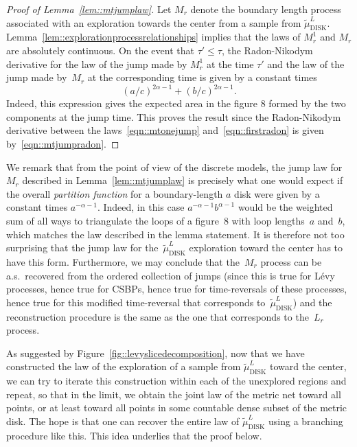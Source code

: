 \documentclass[JEP,XML,SOM,Unicode]{cedram}
\theoremstyle{plain}
\numberwithin{theorem}{section}
\theoremstyle{definition}
\newcommand{\tmudl}{\wt{\mu}_{\mathrm{DISK}}^L}
\let\wt\widetilde
\begin{document}
\begin{proof}[Proof of Lemma~\ref{lem::mtjumplaw}]
Let $M_r$ denote the boundary length process associated with an exploration towards the center from a sample from $\tmudl$. Lemma~\ref{lem::explorationprocessrelationships} implies that the laws of $M_r^1$ and $M_r$ are absolutely continuous. On the event that $\tau' \leq \tau$, the Radon-Nikodym derivative for the law of the jump made by $M_r^1$ at the time $\tau'$ and the law of the jump made by~$M_r$ at the corresponding time is given by a constant times
\begin{equation}
\label{eqn::mtjumpradon}
(a/c)^{2\alpha-1} + (b/c)^{2\alpha - 1}.
\end{equation}
Indeed, this expression gives the expected area in the figure $8$ formed by the two components at the jump time. This proves the result since the Radon-Nikodym derivative between the laws~\eqref{eqn::mtonejump} and~\eqref{eqn::firstradon} is given by~\eqref{eqn::mtjumpradon}.
\end{proof}

We remark that from the point of view of the discrete models, the jump law for~$M_r$ described in Lemma~\ref{lem::mtjumplaw} is precisely what one would expect if the overall \emph{partition function} for a boundary-length $a$ disk were given by a constant times $a^{-\alpha -1}$. Indeed, in this case $a^{-\alpha - 1} b^{\alpha -1}$ would be the weighted sum of all ways to triangulate the loops of a figure~$8$ with loop lengths~$a$ and~$b$, which matches the law described in the lemma statement. It is therefore not too surprising that the jump law for the~$\tmudl$ exploration toward the center has to have this form. Furthermore, we may conclude that the~$M_r$ process can be a.s.\ recovered from the ordered collection of jumps (since this is true for Lévy processes, hence true for CSBPs, hence true for time-reversals of these processes, hence true for this modified time-reversal that corresponds to~$\tmudl$) and the reconstruction procedure is the same as the one that corresponds to the~$L_r$ process.

As suggested by Figure~\ref{fig::levyslicedecomposition}, now that we have constructed the law of the exploration of a sample from $\tmudl$ toward the center, we can try to iterate this construction within each of the unexplored regions and repeat, so that in the limit, we obtain the joint law of the metric net toward all points, or at least toward all points in some countable dense subset of the metric disk. The hope is that one can recover the entire law of $\tmudl$ using a branching procedure like this. This idea underlies that the proof below.
\end{document}

